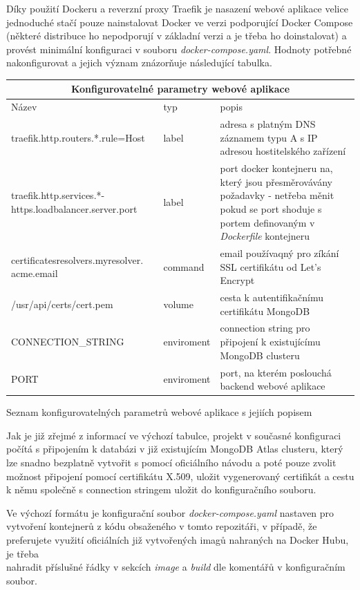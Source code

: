 \documentclass[12pt]{article}
\begin{document}
Díky použití Dockeru a reverzní proxy Traefik je nasazení webové aplikace velice jednoduché stačí pouze nainstalovat Docker ve verzi podporující Docker Compose (některé distribuce ho nepodporují v základní verzi a je třeba ho doinstalovat) a provést minimální konfiguraci v souboru \textit{docker-compose.yaml}. Hodnoty potřebné nakonfigurovat a jejich význam znázorňuje následující tabulka.
\begin{listing}[!ht]
\begin{tabular}{ |p{5.7cm}|p{1.9cm}|p{6cm}| }
\hline
\multicolumn{3}{|c|}{Konfigurovatelné parametry webové aplikace} \\
\hline
Název& typ& popis\\
\hline
traefik.http.routers.*.rule=Host& label& adresa s platným DNS záznamem typu A s IP adresou hostitelského zařízení \\
\hline
traefik.http.services.*-https.loadbalancer.server.port& label& port docker kontejneru na, který jsou přesměrovávány požadavky - netřeba měnit pokud se port shoduje s portem definovaným v \textit{Dockerfile} kontejneru \\
\hline
certificatesresolvers.myresolver. acme.email& command& email používaqný pro zíkání SSL certifikátu od Let's Encrypt \\
\hline
/usr/api/certs/cert.pem& volume& cesta k autentifikačnímu certifikátu MongoDB \\
\hline
CONNECTION\_STRING& enviroment& connection string pro připojení k existujícímu MongoDB clusteru \\
\hline
PORT& enviroment& port, na kterém poslouchá backend webové aplikace \\
\hline
\end{tabular}
\caption{Seznam konfigurovatelných parametrů webové aplikace s jejiích popisem}
\end{listing}
Jak je již zřejmé z informací ve výchozí tabulce, projekt v současné konfiguraci počítá s připojením k databázi v již existujícím MongoDB Atlas clusteru, který lze snadno bezplatně vytvořit s pomocí oficiálního návodu\cite{atlas} a poté pouze zvolit možnost připojení pomocí certifikátu X.509, uložit vygenerovaný certifikát a cestu k němu společně s connection stringem uložit do konfiguračního souboru.

Ve výchozí formátu je konfigurační soubor \textit{docker-compose.yaml} nastaven pro vytvoření kontejnerů z kódu obsaženého v tomto repozitáři, v případě, že preferujete využití oficiálních již vytvořených imagů nahraných na Docker Hubu, je třeba \\\newline nahradit příslušné řádky v sekcích \textit{image} a \textit{build} dle komentářů v konfiguračním soubor.
\end{document}
